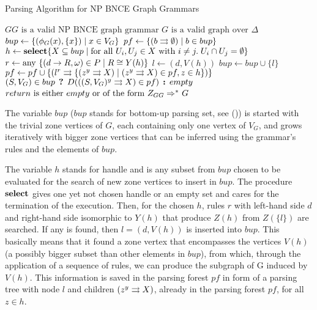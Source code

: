 \documentclass[]{report}
\begin{document}
\begin{algorithm}[!h]
	\caption{Parsing Algorithm for NP BNCE Graph Grammars}
	\begin{algorithmic}[!ht]
		\Require $GG \text{ is a valid NP BNCE graph grammar}$
		\Require $G \text{ is a valid graph over } \Delta$ 
			\State $bup \gets \{(\phi_G(x),\{x\}) \; | \; x \in V_G\}$ 
			\State $pf \gets \{ \ptree{b}{}{\emptyset} \st b \in bup \}$ 
			\Repeat
				\State $h \gets \text{\textbf{select}} \{X \subseteq bup \; | \;\text{for all } U_i, U_j \in X \text{ with } i \neq j . \; U_i \cap U_j = \emptyset \}$
				 
					\State $r \gets \text{any } \{(d \to R,\omega) \in P \; | \; R \cong Y(h) \}$
					\State $l \gets (d,V(h))$
						\State $bup \gets bup \cup \{l\}$ 
						\State $pf \gets pf \cup \{ \ptree{l}{r}{\{\ptree{z}{y}{X} \st \ptree{z}{y}{X} \in pf, z \in h \}} \}$
					\EndIf
				\EndFor
			 
			\State \Return $(S, V_G) \in bup \? D(\ptree{(S,V_G)}{y}{X} \in pf) \: empty $
		\EndFunction
		\Ensure $return \text{ is either } empty \text{ or of the form } \startG{GG} \derivtr{}{}{} G$
	\end{algorithmic}
	\label{alg:parse}
\end{algorithm}

The variable $bup$ ($bup$ stands for bottom-up parsing set, see ())%
is started with the trivial zone vertices of $G$, each containing only one vertex of $V_G$, and grows iteratively with bigger zone vertices that can be inferred using the grammar's rules and the elements of $bup$.

The variable $h$ stands for handle and is any subset from $bup$ chosen to be evaluated for the search of new zone vertices to insert in $bup$. The procedure $\textbf{select}$ gives one yet not chosen handle or an empty set and cares for the termination of the execution. Then, for the chosen $h$, rules $r$ with left-hand side $d$ and right-hand side isomorphic to $Y(h)$ that produce $Z(h)$ from $Z(\{l\})$ are searched. If any is found, then $l = (d,V(h))$ is inserted into $bup$. This basically means that it found a zone vertex that encompasses the vertices $V(h)$ (a possibly bigger subset than other elements in $bup$), from which, through the application of a sequence of rules, we can produce the subgraph of G induced by $V(h)$. This information is saved in the parsing forest $pf$ in form of a parsing tree with node $l$ and children $\ptree{z}{y}{X}$, already in the parsing forest $pf$, for all $z \in h$.
\end{document}
